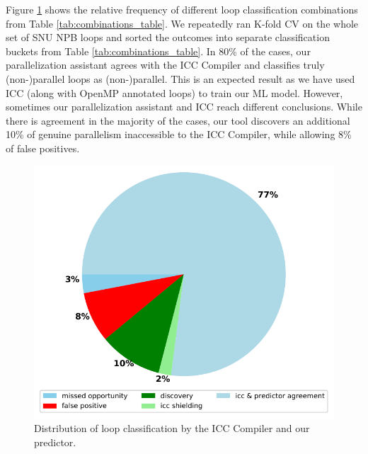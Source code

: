 Figure \ref{fig:icc_competition} shows the relative frequency of different loop classification combinations from Table \ref{tab:combinations_table}. We repeatedly ran K-fold CV on the whole set of SNU NPB loops and sorted the outcomes into separate classification buckets from Table \ref{tab:combinations_table}. In 80\% of the cases, our parallelization assistant agrees with the ICC Compiler and classifies truly (non-)parallel loops as (non-)parallel. This is an expected result as we have used ICC (along with OpenMP annotated loops) to train our ML model. However, sometimes our parallelization assistant and ICC reach different conclusions. While there is agreement in the majority of the cases, our tool discovers an additional 10\% of genuine parallelism inaccessible to the ICC Compiler, while allowing 8\% of false positives.

\begin{figure}[t!]
    \centering
    \includegraphics[width=0.9\columnwidth]{images/pie.pdf}
    \caption{
      Distribution of loop classification by the ICC Compiler and our predictor.}
    \label{fig:icc_competition}
\vspace*{-5mm}
\end{figure}

